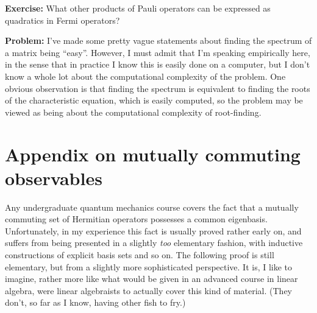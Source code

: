 \documentclass[12pt]{article}
\begin{document}
{\textbf{Exercise:} What other products of Pauli operators can be
expressed as quadratics in Fermi operators?

\textbf{Problem:} I've made some pretty vague statements about finding
the spectrum of a matrix being ``easy''.  However, I must admit that
I'm speaking empirically here, in the sense that in practice I know
this is easily done on a computer, but I don't know a whole lot about
the computational complexity of the problem.  One obvious observation
is that finding the spectrum is equivalent to finding the roots of the
characteristic equation, which is easily computed, so the problem may
be viewed as being about the computational complexity of root-finding.




\section{Appendix on mutually commuting observables}

Any undergraduate quantum mechanics course covers the fact that a
mutually commuting set of Hermitian operators possesses a common
eigenbasis.  Unfortunately, in my experience this fact is usually
proved rather early on, and suffers from being presented in a slightly
\emph{too} elementary fashion, with inductive constructions of
explicit basis sets and so on.  The following proof is still
elementary, but from a slightly more sophisticated perspective.  It
is, I like to imagine, rather more like what would be given in an
advanced course in linear algebra, were linear algebraists to actually
cover this kind of material.  (They don't, so far as I know, having
other fish to fry.)

}
\end{document}
